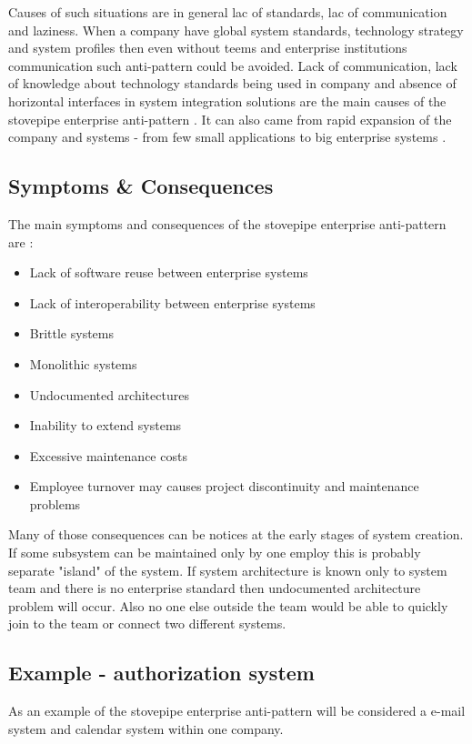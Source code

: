 Causes of such situations are in general lac of standards, lac of communication and laziness. When a company have global system standards, technology strategy and system profiles then even without teems and enterprise institutions communication such anti-pattern could be avoided. Lack of communication, lack of knowledge about technology standards being used in company and absence of horizontal interfaces in system integration solutions are the main causes of the stovepipe enterprise anti-pattern \cite{SurvivalGuide}.
It can also came from rapid expansion of the company and systems - from few small applications to big enterprise systems \cite{Dragon}.

\subsection{Symptoms \& Consequences}

The main symptoms and consequences of the stovepipe enterprise anti-pattern are \cite{SurvivalGuide}:
\begin{itemize}
	\item Lack of software reuse between enterprise systems
	\item Lack of interoperability between enterprise systems
	\item Brittle systems
	\item Monolithic systems
	\item Undocumented architectures
	\item Inability to extend systems
	\item Excessive maintenance costs
	\item Employee turnover may causes project discontinuity and maintenance problems
\end{itemize}
Many of those consequences can be notices at the early stages of system creation. If some subsystem can be maintained only by one employ this is probably separate "island" of the system. If system architecture is known only to system team and there is no enterprise standard then undocumented architecture problem will occur. Also no one else outside the team would be able to quickly join to the team or connect two different systems.


\subsection{Example - authorization system}

As an example of the stovepipe enterprise anti-pattern will be considered a e-mail system and calendar system within one company.

